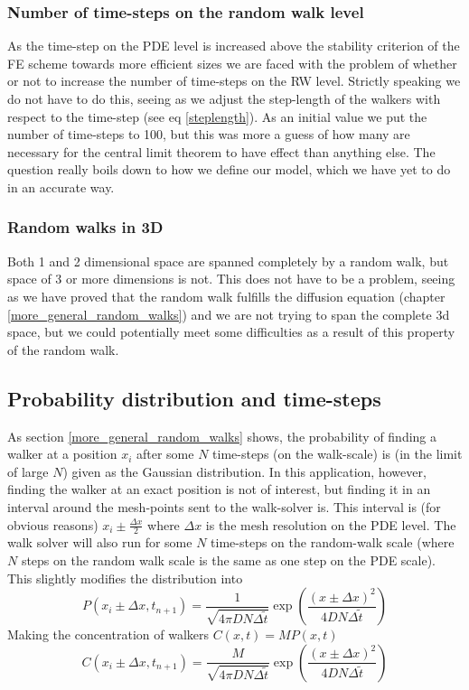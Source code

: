 \subsubsection{Number of time-steps on the random walk level}
 As the time-step on the PDE level is increased above the stability criterion of the FE scheme towards more efficient sizes we are faced with the problem of whether or not to increase the number of time-steps on the RW level. 
 Strictly speaking we do not have to do this, seeing as we adjust the step-length of the walkers with respect to the time-step (see eq \ref{steplength}). 
 As an initial value we put the number of time-steps to 100, but this was more a guess of how many are necessary for the central limit theorem to have effect than anything else. 
 The question really boils down to how we define our model, which we have yet to do in an accurate way.

\subsubsection{Random walks in 3D}
 Both 1 and 2 dimensional space are spanned completely by a random walk, but space of 3 or more dimensions is not. 
 This does not have to be a problem, seeing as we have proved that the random walk fulfills the diffusion equation (chapter \ref{more_general_random_walks}) and we are not trying to span the complete 3d space, but we could potentially meet some difficulties as a result of this property of the random walk.

\subsection{Probability distribution and time-steps}\label{probability_distribution_and_timesteps}
As section \ref{more_general_random_walks} shows, the probability of finding a walker at a position $x_i$ after some $N$ time-steps (on the walk-scale) is (in the limit of large $N$) given as the Gaussian distribution. 
In this application, however, finding the walker at an exact position is not of interest, but finding it in an interval around the mesh-points sent to the walk-solver is. 
This interval is (for obvious reasons) $x_i\pm\frac{\Delta x}{2}$ where $\Delta x$ is the mesh resolution on the PDE level. 
The walk solver will also run for some $N$ time-steps on the random-walk scale (where $N$ steps on the random walk scale is the same as one step on the PDE scale). 
This slightly modifies the distribution into
\begin{equation}
 P(x_i\pm\Delta x,t_{n+1}) = \frac{1}{\sqrt{4\pi DN\Delta \tilde{t}}}\exp\left(\frac{(x\pm\Delta x)^2}{4DN\Delta \tilde{t}}\right)
\end{equation}
Making the concentration of walkers $C(x,t) = MP(x,t)$
\begin{equation}
 C(x_i\pm\Delta x,t_{n+1}) = \frac{M}{\sqrt{4\pi DN\Delta \tilde{t}}}\exp\left(\frac{(x\pm\Delta x)^2}{4DN\Delta \tilde{t}}\right)
\end{equation}

